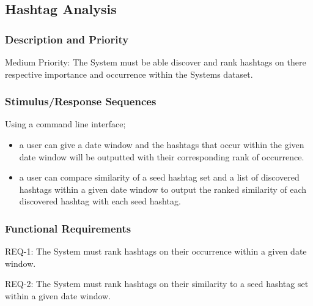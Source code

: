 \subsection*{Hashtag Analysis}
\subsubsection*{Description and Priority}
Medium Priority: The System must be able discover and rank hashtags on there respective importance and occurrence within the Systems dataset.
\subsubsection*{Stimulus/Response Sequences}
Using a command line interface; 
\begin{itemize}
\item a user can give a date window and the hashtags that occur within the given date window will be outputted with their corresponding rank of occurrence.
\item a user can compare similarity of a seed hashtag set and a list of discovered hashtags within a given date window to output the ranked similarity of each discovered hashtag with each seed hashtag. 
\end{itemize}
\subsubsection*{Functional Requirements}
REQ-1:	The System must rank hashtags on their occurrence within a given date window.

REQ-2: The System must rank hashtags on their similarity to a seed hashtag set within a given date window. 